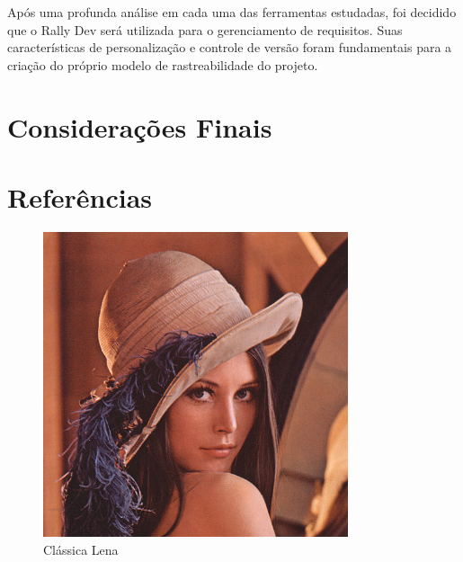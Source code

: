 \tab Após uma profunda análise em cada uma das ferramentas estudadas, foi decidido que o Rally Dev será utilizada para o gerenciamento de requisitos. Suas características de personalização e controle de versão foram fundamentais para a criação do próprio modelo de rastreabilidade do projeto.  \\


\section{Considerações Finais}
\label{sec:nova_sess_o}

\section{Referências}
\label{sec:nova_sess_o}




\onecolumn
\begin{usecase}



\end{usecase}
\onecolumn

\onecolumn
\begin{figure}[h]
  \begin{center}
    \includegraphics[width=0.8\textwidth]{conteudo/lena}
    \caption{Clássica Lena}
  \end{center}
\end{figure}
\onecolumn

